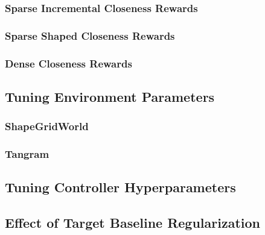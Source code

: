 
\subsubsection{Sparse Incremental Closeness Rewards}
\label{sec:sparse-incremental-closeness}


\subsubsection{Sparse Shaped Closeness Rewards}
\label{sec:sparse-shaped-closeness}


\subsubsection{Dense Closeness Rewards}
\label{sec:dense-closeness}


\subsection{Tuning Environment Parameters}
\label{sec:env-hyperparameters}

\subsubsection{ShapeGridWorld}
\label{sec:sgw-parameters}


\subsubsection{Tangram}
\label{sec:tangram-parameters}


\subsection{Tuning Controller Hyperparameters}
\label{sec:icem-hyperparameters}


\subsection{Effect of Target Baseline Regularization}
\label{sec:reg-alpha}


